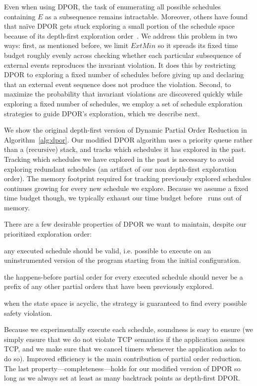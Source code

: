 Even when using DPOR, the task of enumerating all possible schedules containing $E$ as a
subsequence remains intractable. Moreover, others have found that na\"ive DPOR
gets stuck exploring a small portion of the schedule space because of its
depth-first exploration order~\cite{lin2009modist}.
We address this problem in two ways: first, as mentioned before, we limit
$ExtMin$ so it spreads its fixed time budget roughly evenly across
checking whether each particular subsequence of external events reproduces the invariant violation. It does this by
restricting DPOR to exploring a fixed number of schedules before
giving up and declaring that an external event sequence does not produce the violation. Second, to maximize the probability that
invariant violations are discovered quickly while exploring a fixed number of
schedules, we employ a set of schedule exploration strategies to guide
DPOR's exploration, which we describe next.

We show the original depth-first version of Dynamic Partial Order Reduction
in Algorithm~\ref{alg:dpor}. Our modified DPOR algorithm uses a priority queue
rather than a (recursive) stack, and tracks which schedules it has explored
in the past. Tracking which schedules we have explored in the past is
necessary to avoid exploring redundant schedules (an artifact of our non depth-first
exploration order). The memory footprint required for tracking previously explored
schedules continues growing for every new schedule we explore. Because we
assume a fixed time budget though,
we typically exhaust our time budget before \sys~runs out of memory.

There are a few desirable properties of DPOR we want to maintain,
despite our prioritized exploration order:

 any executed schedule should be valid, i.e. possible
to execute on an uninstrumented version of the program starting from the
initial configuration.

 the happens-before partial order for every executed schedule
should never be a prefix of any other partial orders that have been
previously explored.

 when the state space is acyclic, the strategy is guaranteed to
find every possible safety violation.

Because we experimentally execute each schedule, soundness is easy to
ensure (we simply ensure that we do not violate TCP semantics if the application
assumes TCP, and we make sure that
we cancel timers whenever the application asks to do so).
Improved efficiency is the main contribution of partial order reduction. The last
property---completeness---holds for our modified version of DPOR so long as we
always set at least as many backtrack points as depth-first
DPOR.


